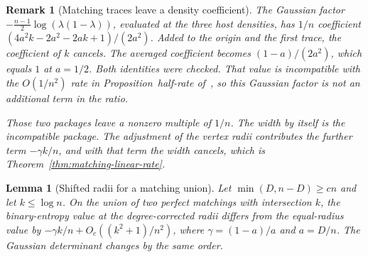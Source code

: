 \documentclass[11pt]{article}
\newtheorem{lemma}[theorem]{Lemma}
\newtheorem{remark}[theorem]{Remark}
\begin{document}
\begin{remark}[Matching traces leave a density coefficient]
The Gaussian factor \(-\frac{n-1}{2}\log(\lambda(1-\lambda))\), evaluated at
the three host densities, has \(1/n\) coefficient
\((4a^2 k-2a^2-2ak+1)/(2a^2)\).
Added to the origin and the first trace, the coefficient of \(k\) cancels.
The averaged coefficient becomes \((1-a)/(2a^2)\), which equals \(1\) at
\(a=1/2\). Both identities were checked. That value is incompatible with the
\(O(1/n^2)\) rate in Proposition~half-rate of~\cite{PlusOneV1}, so this
Gaussian factor is not an additional term in the ratio.

Those two packages leave a nonzero multiple of \(1/n\). The width by itself
is the incompatible package. The adjustment of the vertex radii contributes
the further term \(-\gamma k/n\), and with that term the width cancels, which
is Theorem~\ref{thm:matching-linear-rate}.
\end{remark}

\begin{lemma}[Shifted radii for a matching union]
\label{lem:mismatch-shift}
Let \(\min(D,n-D)\ge cn\) and let \(k\le\log n\). On the union of two perfect
matchings with intersection \(k\), the binary-entropy value at the
degree-corrected radii differs from the equal-radius value by
\(-\gamma k/n+O_c((k^2+1)/n^2)\), where \(\gamma=(1-a)/a\) and \(a=D/n\).
The Gaussian determinant changes by the same order.
\end{lemma}
\end{document}
